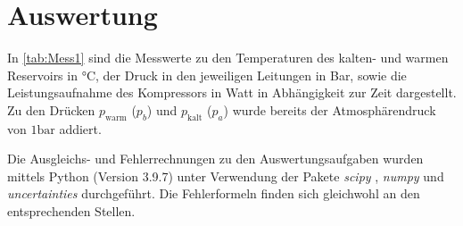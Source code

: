 \section{Auswertung}
\label{sec:Auswertung}
In \autoref{tab:Mess1} sind die Messwerte zu den Temperaturen des kalten- und warmen Reservoirs in °C, der Druck in den jeweiligen Leitungen in Bar, sowie die Leistungsaufnahme 
des Kompressors in Watt in Abhängigkeit zur Zeit dargestellt. Zu den Drücken $p_\text{warm}$ ($p_b$) und $p_\text{kalt}$ ($p_a$) wurde bereits der Atmosphärendruck von 
$1 \unit{\bar}$ addiert.

Die Ausgleichs- und Fehlerrechnungen zu den Auswertungsaufgaben wurden mittels Python (Version 3.9.7) unter Verwendung der Pakete \textit{scipy} \cite{scipy}, \textit{numpy}
\cite{numpy} und \textit{uncertainties} \cite{uncertainties} durchgeführt. Die Fehlerformeln finden sich gleichwohl an den entsprechenden Stellen.


